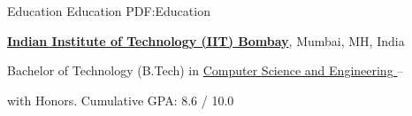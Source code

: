 \Section
{Education}
{Education}
{PDF:Education}

\Entry
\href{https://www.iitb.ac.in}
{\textbf{Indian Institute of Technology (IIT) Bombay}},
Mumbai, MH, India

\Gap
\BulletItem
Bachelor of Technology (B.Tech) in 
\href{https://www.cse.iitb.ac.in}
{Computer Science and Engineering }
\hfill
{} --
\begin{Detail}
\SubBulletItem
with Honors.
\SubBulletItem
Cumulative GPA: 8.6 / 10.0
\end{Detail}